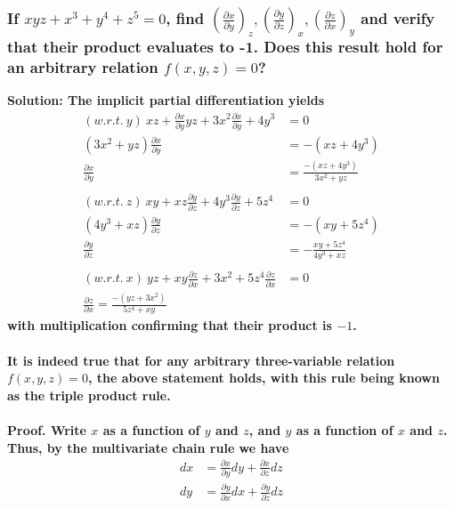 \documentclass{article}
\begin{document}
\subsubsection*{If $xyz+x^3+y^4+z^5 = 0$, find $(\frac{\partial x}{\partial y})_z, (\frac{\partial y}{\partial z})_x, (\frac{\partial z}{\partial x})_y$ and verify that their product evaluates to -1. Does this result hold for an arbitrary relation $f(x,y,z) = 0$?}
\bf Solution:
\normalfont The implicit partial differentiation yields
\begin{equation*}
    \begin{aligned}
        (w.r.t.\ y)\ xz + \frac{\partial x}{\partial y}yz + 3x^2 \frac{\partial x}{\partial y} + 4y^3 &= 0 \\
        (3x^2 + yz)\frac{\partial x}{\partial y} &= -(xz+4y^3) \\
        \frac{\partial x}{\partial y} &= \frac{-(xz + 4y^3)}{3x^2+yz} \\ \\
        (w.r.t.\ z)\ xy + xz \frac{\partial y}{\partial z} + 4y^3 \frac{\partial y}{\partial z} + 5z^4 &= 0 \\
        (4y^3 + xz)\frac{\partial y}{\partial z} &= -(xy + 5z^4) \\
        \frac{\partial y}{\partial z} &= -\frac{xy+5z^4}{4y^3+xz} \\ \\
        (w.r.t.\ x)\ yz + xy\frac{\partial z}{\partial x} + 3x^2 + 5z^4 \frac{\partial z}{\partial x} & = 0 \\
        \frac{\partial z}{\partial x} = \frac{-(yz+3x^2)}{5z^4 + xy}
    \end{aligned}
\end{equation*}
with multiplication confirming that their product is $-1$.
\\ 
\\
It is indeed true that for any arbitrary three-variable relation $f(x,y,z)=0$, the above statement holds, with this rule being known as the triple product rule. \\
\\
\bf Proof. \normalfont Write $x$ as a function of $y$ and $z$, and $y$ as a function of $x$ and $z$. Thus, by the multivariate chain rule we have 
\begin{equation*}
    \begin{aligned}
        dx &= \frac{\partial x}{\partial y} dy + \frac{\partial x}{\partial z} dz \\
        dy &= \frac{\partial y}{\partial x} dx + \frac{\partial y}{\partial z} dz
    \end{aligned}
\end{equation*}
\end{document}
